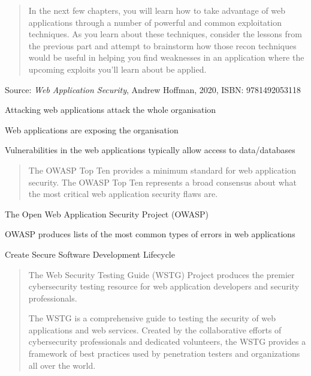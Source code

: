 \documentclass[Screen16to9,17pt]{foils}
\begin{document}


\begin{quote}
  In the next few chapters, you will learn how to take advantage of web applications
  through a number of powerful and common exploitation techniques. As you learn
  about these techniques, consider the lessons from the previous part and attempt to
  brainstorm how those recon techniques would be useful in helping you find weaknesses in an application where the upcoming exploits you’ll learn about be applied.
\end{quote}
Source: \emph{Web Application Security}, Andrew Hoffman, 2020, ISBN: 9781492053118

\begin{list2}
\item Attacking web applications attack the whole organisation
\item Web applications are exposing the organisation
\item Vulnerabilities in the web applications typically allow access to data/databases
\end{list2}



\begin{quote}
The OWASP Top Ten provides a minimum standard for web application
security. The OWASP Top Ten represents a broad consensus about what
the most critical web application security flaws are.
\end{quote}

\begin{list1}
\item The Open Web Application Security Project (OWASP)
\item OWASP produces lists of the most common types of errors in web applications
\item {}
\item Create Secure Software Development Lifecycle
\end{list1}


\begin{quote}
The Web Security Testing Guide (WSTG) Project produces the premier cybersecurity
testing resource for web application developers and security professionals.

The WSTG is a comprehensive guide to testing the security of web applications and
web services. Created by the collaborative efforts of cybersecurity professionals
and dedicated volunteers, the WSTG provides a framework of best practices used by
penetration testers and organizations all over the world.
\end{quote}
\end{document}
